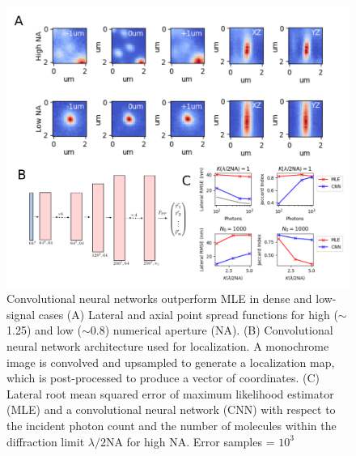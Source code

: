 \documentclass{ucetd}
\begin{document}
\begin{figure}
\begin{center}
\includegraphics[width=14cm]{PSF2D.png}
\end{center}
\caption{Convolutional neural networks outperform MLE in dense and low-signal cases (A) Lateral and axial point spread functions for high ($\sim$1.25) and low ($\sim$0.8) numerical aperture (NA). (B) Convolutional neural network architecture used for localization. A monochrome image is convolved and upsampled to generate a localization map, which is post-processed to produce a vector of coordinates. (C) Lateral root mean squared error of maximum likelihood estimator (MLE) and a convolutional neural network (CNN) with respect to the incident photon count and the number of molecules within the diffraction limit $\lambda/2\mathrm{NA}$ for high NA. Error samples = $10^{3}$}
\end{figure}
\end{document}
